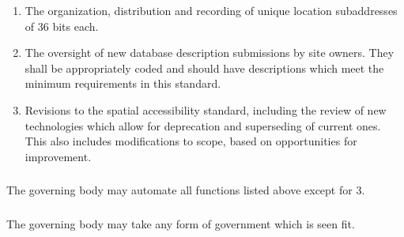 \documentclass{article}
\begin{document}
\begin{enumerate}
  \item The organization, distribution and recording of unique location subaddresses of 36 bits each.
  \item The oversight of new database description submissions by site owners. They shall be appropriately coded and should have descriptions which meet the minimum requirements in this standard.
  \item Revisions to the spatial accessibility standard, including the review of new technologies which allow for deprecation and superseding of current ones. This also includes modifications to scope, based on opportunities for improvement.  
\end{enumerate}

\subsubsection{} The governing body may automate all functions listed above except for 3.

\subsubsection{} The governing body may take any form of government which is seen fit.
\end{document}
